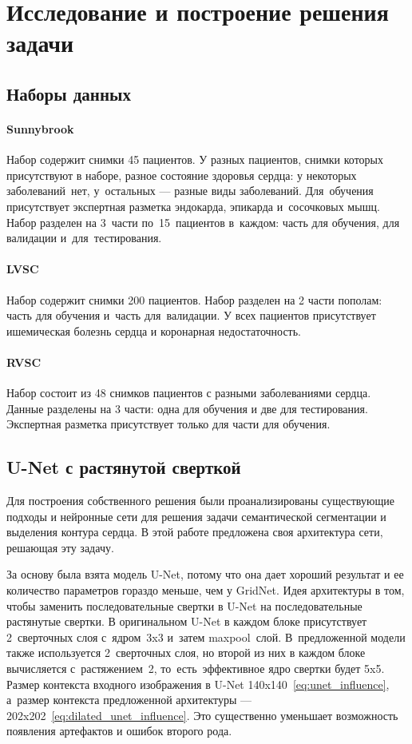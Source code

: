 \section{Исследование и построение решения задачи}

\subsection{Наборы данных}

\paragraph{Sunnybrook}

Набор содержит снимки 45 пациентов. У разных пациентов, 
снимки которых присутствуют в наборе, разное состояние здоровья сердца: 
у некоторых заболеваний~нет, у~остальных — разные виды заболеваний. 
Для~обучения присутствует экспертная разметка эндокарда, эпикарда 
и~сосочковых мышц. Набор разделен на 3~части по~15~пациентов 
в~каждом: часть для обучения, для валидации и~для~тестирования.

\paragraph{LVSC}

Набор содержит снимки 200 пациентов. Набор разделен на 2 части пополам: часть для обучения и~часть для~валидации. У всех пациентов присутствует ишемическая болезнь сердца и коронарная недостаточность.

\paragraph{RVSC}

Набор состоит из 48 снимков пациентов с разными заболеваниями сердца. Данные разделены на 3 части: одна для обучения и две для тестирования. Экспертная разметка присутствует только для части для обучения.

\subsection{U-Net с растянутой сверткой}

Для построения собственного решения были проанализированы существующие подходы и нейронные сети для решения задачи семантической сегментации и выделения контура сердца. В этой работе предложена своя архитектура сети, решающая эту задачу.

За основу была взята модель U-Net, потому что она дает хороший результат и ее количество параметров гораздо меньше, чем у GridNet. Идея архитектуры в том, чтобы заменить последовательные свертки в U-Net на последовательные растянутые свертки. В оригинальном U-Net в каждом блоке присутствует 2~сверточных слоя с~ядром~3x3 и~затем maxpool~слой. В~предложенной модели также используется 2~сверточных слоя, но второй из них в каждом блоке вычисляется с~растяжением~2, то~есть~эффективное ядро свертки будет 5x5. Размер контекста входного изображения в U-Net 140x140~\eqref{eq:unet_influence}, а~размер контекста предложенной архитектуры — 202x202~\eqref{eq:dilated_unet_influence}. Это существенно уменьшает возможность появления артефактов и ошибок второго рода.

